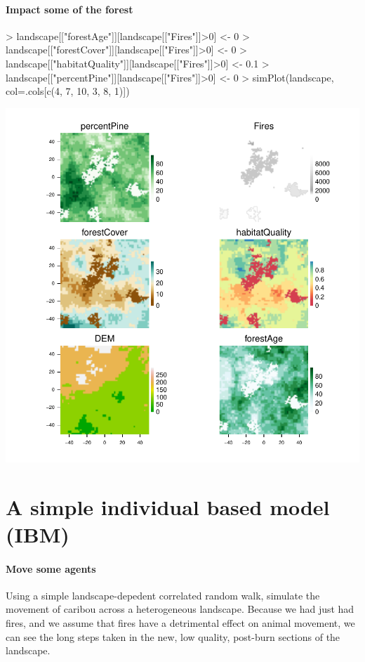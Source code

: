 \documentclass{article}
\begin{document}
\paragraph{Impact some of the forest}
\begin{Schunk}
\begin{Sinput}
> landscape[["forestAge"]][landscape[["Fires"]]>0] <- 0
> landscape[["forestCover"]][landscape[["Fires"]]>0] <- 0
> landscape[["habitatQuality"]][landscape[["Fires"]]>0] <- 0.1
> landscape[["percentPine"]][landscape[["Fires"]]>0] <- 0
> simPlot(landscape, col=.cols[c(4, 7, 10, 3, 8, 1)])
\end{Sinput}
\end{Schunk}
\includegraphics{introduction-fire-impacts-maps}

\section{A simple individual based model (IBM)}
\paragraph{Move some agents}
Using a simple landscape-depedent correlated random walk, simulate the movement of caribou across a heterogeneous landscape. Because we had just had fires, and we assume that fires have a detrimental effect on animal movement, we can see the long steps taken in the new, low quality, post-burn sections of the landscape.
\end{document}

